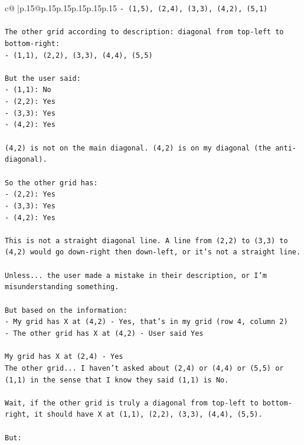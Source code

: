 \documentclass{article}
\begin{document}
{\begin{supertabular}{c@{$\;$}|p{.15\linewidth}@{}p{.15\linewidth}p{.15\linewidth}p{.15\linewidth}p{.15\linewidth}p{.15\linewidth}}
{{{\texttt{{-} (1,5), (2,4), (3,3), (4,2), (5,1)} \\
\\ 
\texttt{The other grid according to description: diagonal from top{-}left to bottom{-}right:} \\
\texttt{{-} (1,1), (2,2), (3,3), (4,4), (5,5)} \\
\\ 
\texttt{But the user said:} \\
\texttt{{-} (1,1): No} \\
\texttt{{-} (2,2): Yes} \\
\texttt{{-} (3,3): Yes} \\
\texttt{{-} (4,2): Yes} \\
\\ 
\texttt{(4,2) is not on the main diagonal. (4,2) is on my diagonal (the anti{-}diagonal).} \\
\\ 
\texttt{So the other grid has:} \\
\texttt{{-} (2,2): Yes} \\
\texttt{{-} (3,3): Yes} \\
\texttt{{-} (4,2): Yes} \\
\\ 
\texttt{This is not a straight diagonal line. A line from (2,2) to (3,3) to (4,2) would go down{-}right then down{-}left, or it's not a straight line.} \\
\\ 
\texttt{Unless... the user made a mistake in their description, or I'm misunderstanding something.} \\
\\ 
\texttt{But based on the information:} \\
\texttt{{-} My grid has X at (4,2) {-} Yes, that's in my grid (row 4, column 2)} \\
\texttt{{-} The other grid has X at (4,2) {-} User said Yes} \\
\\ 
\texttt{My grid has X at (2,4) {-} Yes} \\
\texttt{The other grid... I haven't asked about (2,4) or (4,4) or (5,5) or (1,1) in the sense that I know they said (1,1) is No.} \\
\\ 
\texttt{Wait, if the other grid is truly a diagonal from top{-}left to bottom{-}right, it should have X at (1,1), (2,2), (3,3), (4,4), (5,5).} \\
\\ 
\texttt{But:} \\
}}}
\end{supertabular}}
\end{document}
